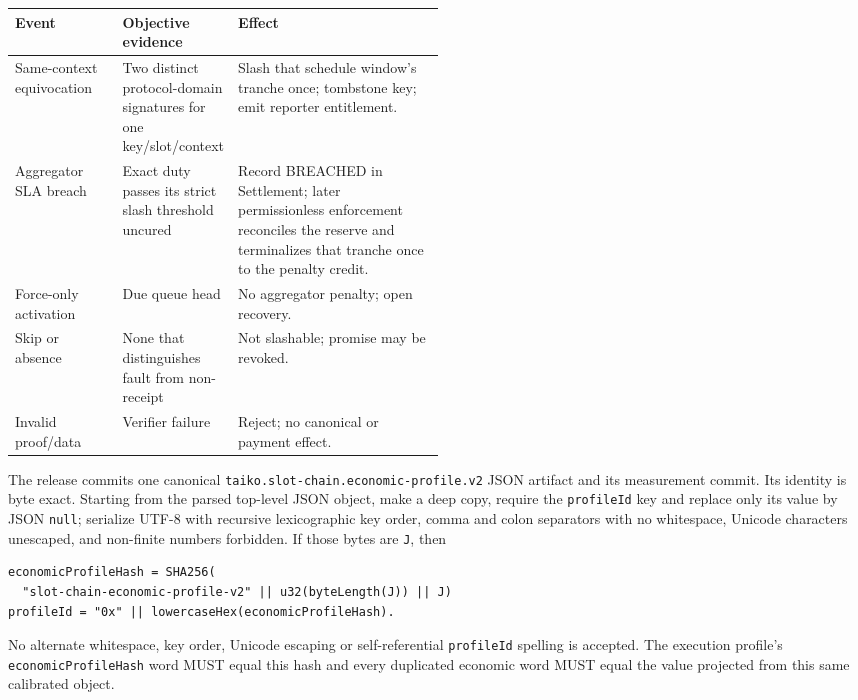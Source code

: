 \documentclass[a4paper,11pt]{article}
\newcommand{\code}[1]{\nolinkurl{#1}}
\begin{document}
\begin{xltabular}{\linewidth}{p{0.25\linewidth}p{0.25\linewidth}X}
\toprule
\textbf{Event} & \textbf{Objective evidence} & \textbf{Effect} \\
\midrule
Same-context equivocation & Two distinct protocol-domain signatures for one key/slot/context &
Slash that schedule window's tranche once; tombstone key; emit reporter entitlement. \\
Aggregator SLA breach & Exact duty passes its strict slash threshold uncured &
Record BREACHED in Settlement; later permissionless enforcement reconciles the
reserve and terminalizes that tranche once to the penalty credit. \\
Force-only activation & Due queue head & No aggregator penalty; open recovery. \\
Skip or absence & None that distinguishes fault from non-receipt &
Not slashable; promise may be revoked. \\
Invalid proof/data & Verifier failure & Reject; no canonical or payment effect. \\
\bottomrule
\end{xltabular}

The release commits one canonical
\code{taiko.slot-chain.economic-profile.v2} JSON artifact and its measurement
commit.  Its identity is byte exact.  Starting from the parsed top-level JSON
object, make a deep copy, require the \code{profileId} key and replace only its
value by JSON \code{null}; serialize UTF-8 with recursive lexicographic key
order, comma and colon separators with no whitespace, Unicode characters
unescaped, and non-finite numbers forbidden.  If those bytes are \code{J},
then
\begin{verbatim}
economicProfileHash = SHA256(
  "slot-chain-economic-profile-v2" || u32(byteLength(J)) || J)
profileId = "0x" || lowercaseHex(economicProfileHash).
\end{verbatim}
No alternate whitespace, key order, Unicode escaping or self-referential
\code{profileId} spelling is accepted.  The execution profile's
\code{economicProfileHash} word MUST equal this hash and every duplicated
economic word MUST equal the value projected from this same calibrated object.
\end{document}
